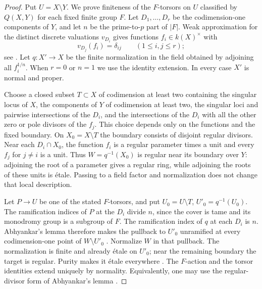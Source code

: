 \begin{proof}
Put $U=X\setminus Y$. We prove finiteness of the $F$-torsors
on $U$ classified by $Q(X,Y)$ for each fixed finite group $F$.
Let $D_1,\ldots,D_r$ be the codimension-one components of $Y$,
and let $n$ be the prime-to-$p$ part of $|F|$. Weak approximation
for the distinct discrete valuations $v_{D_i}$ gives functions
$f_i\in k(X)^\times$ with
\[
 v_{D_j}(f_i)=\delta_{ij}
 \qquad(1\leq i,j\leq r);
\]
see \cite[Theorem 14.3.1]{SteinWeakD}. Let $q:X'\to X$ be
the finite normalization in the field obtained by adjoining
all $f_i^{1/n}$. When $r=0$ or $n=1$ we use the identity
extension. In every case $X'$ is normal and proper.

Choose a closed subset $T\subset X$ of codimension at least
two containing the singular locus of $X$, the components of
$Y$ of codimension at least two, the singular loci and pairwise
intersections of the $D_i$, and the intersections of the $D_i$
with all the other zero or pole divisors of the $f_j$.
This choice depends only on the functions and the fixed
boundary. On $X_0=X\setminus T$ the boundary consists of
disjoint regular divisors. Near each $D_i\cap X_0$, the function
$f_i$ is a regular parameter times a unit and every $f_j$ for
$j\ne i$ is a unit. Thus $W=q^{-1}(X_0)$ is regular near
its boundary over $Y$: adjoining the root of a parameter
gives a regular ring, while adjoining the roots of these
units is \'etale. Passing to a field factor and normalization
does not change that local description.

Let $P\to U$ be one of the stated $F$-torsors, and put
$U_0=U\setminus T$, $U'_0=q^{-1}(U_0)$. The ramification
indices of $P$ at the $D_i$ divide $n$, since the cover is
tame and its monodromy group is a subgroup of $F$.
The ramification index of $q$ at each $D_i$ is $n$.
Abhyankar's lemma therefore makes the pullback to $U'_0$
unramified at every codimension-one point of $W\setminus U'_0$
\cite[Lemma 15.116.4, tag 0BRM]{StacksDTame}.
Normalize $W$ in that pullback. The normalization is finite
and already \'etale on $U'_0$; near the remaining boundary
the target is regular. Purity makes it \'etale everywhere
\cite[X, Theorem 3.3]{SGA1}. The $F$-action and the torsor
identities extend uniquely by normality. Equivalently, one
may use the regular-divisor form of Abhyankar's lemma
\cite[Lemma 58.31.5, tag 0EYG]{StacksDTame}.


\end{proof}
